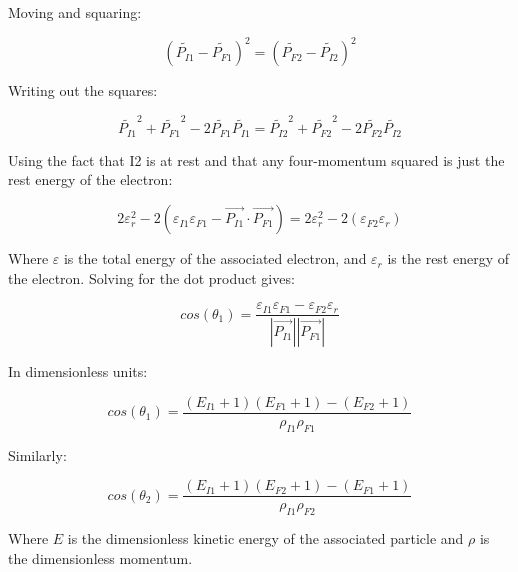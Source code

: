 \documentclass[]{article}
\begin{document}
Moving and squaring:

\[ 
(\tilde{P_{I1}}-\tilde{P_{F1}})^2=(\tilde{P_{F2}}-\tilde{P_{I2}})^2
\]

Writing out the squares:

\[ 
\tilde{P_{I1}}^2 + \tilde{P_{F1}}^2 - 2\tilde{P_{F1}}\tilde{P_{I1}}=\tilde{P_{I2}}^2 + \tilde{P_{F2}}^2 - 2\tilde{P_{F2}}\tilde{P_{I2}}
\]

Using the fact that I2 is at rest and that any four-momentum squared is just the rest energy of the electron:

\[ 
2\varepsilon_r^2 - 2(\varepsilon_{I1}\varepsilon_{F1}- \vec{P_{I1}}\cdot\vec{P_{F1}})=2\varepsilon_r^2 - 2(\varepsilon_{F2}\varepsilon_r)
\] 

Where $\varepsilon$ is the total energy of the associated electron, and $\varepsilon_r$ is the rest energy of the electron. Solving for the dot product gives:

\[ 
cos(\theta_1)=\frac{\varepsilon_{I1}\varepsilon_{F1}-\varepsilon_{F2}\varepsilon_r}{ \left| \vec{P_{I1}} \right| \left| \vec{P_{F1}} \right|  }
 \]
 
In dimensionless units:

\begin{equation}
cos(\theta_1)=\frac{(E_{I1}+1)(E_{F1}+1)-(E_{F2}+1)}{\rho_{I1}\rho_{F1}}
\end{equation}

Similarly:

\begin{equation}
cos(\theta_2)=\frac{(E_{I1}+1)(E_{F2}+1)-(E_{F1}+1)}{\rho_{I1}\rho_{F2}}
\end{equation}

Where $E$ is the dimensionless kinetic energy of the associated particle and $\rho$ is the dimensionless momentum.
\end{document}

